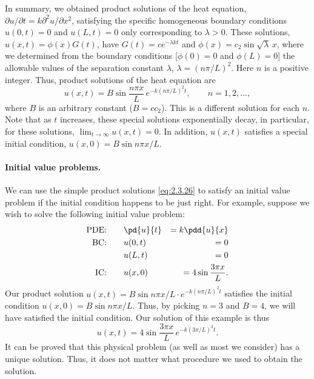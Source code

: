 In summary, we obtained product solutions of the heat equation, $\partial u/\partial t = k\partial^2 u/\partial x^2$, satisfying the specific homogeneous boundary conditions $u(0,t) = 0$ and $u(L,t) = 0$ only corresponding to $\lambda > 0$. These solutions, $u(x,t) = \phi(x)G(t)$, have $G(t) = ce^{-\lambda kt}$ and $\phi(x) = c_2\sin\sqrt{\lambda}\,x$, where we determined from the boundary conditions [$\phi(0) = 0$ and $\phi(L) = 0$] the allowable values of the separation constant $\lambda$, $\lambda = (n\pi/L)^2$. Here $n$ is a positive integer. Thus, product solutions of the heat equation are
\begin{equation}
\label{eq:2.3.26}
u(x,t) = B\sin\frac{n\pi x}{L}\,e^{-k(n\pi/L)^2 t}, \qquad n = 1, 2, \ldots,
\end{equation}
where $B$ is an arbitrary constant ($B = cc_2$). This is a different solution for each $n$. Note that as $t$ increases, these special solutions exponentially decay, in particular, for these solutions, $\lim_{t\to\infty} u(x,t) = 0$. In addition, $u(x,t)$ satisfies a special initial condition, $u(x,0) = B\sin n\pi x/L$.

\paragraph{Initial value problems.}
We can use the simple product solutions \eqref{eq:2.3.26} to satisfy an initial value problem if the initial condition happens to be just right. For example, suppose we wish to solve the following initial value problem:
\begin{alignat*}{2}
\text{PDE:}& \qquad \pd{u}{t} &= k\pdd{u}{x} \\
\text{BC:}& \qquad u(0,t) &= 0 \\
& \qquad u(L,t) &= 0 \\
\text{IC:}& \qquad u(x,0) &= 4\sin\frac{3\pi x}{L}.
\end{alignat*}
Our product solution $u(x,t) = B\sin n\pi x/L \cdot e^{-k(n\pi/L)^2 t}$ satisfies the initial condition $u(x,0) = B\sin n\pi x/L$. Thus, by picking $n = 3$ and $B = 4$, we will have satisfied the initial condition. Our solution of this example is thus
\[
u(x,t) = 4\sin\frac{3\pi x}{L}\,e^{-k(3\pi/L)^2 t}.
\]
It can be proved that this physical problem (as well as most we consider) has a unique solution. Thus, it does not matter what procedure we used to obtain the solution.

